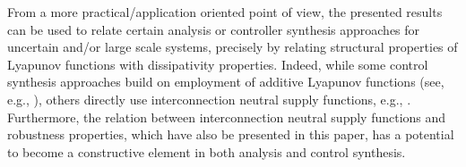 \documentclass[11pt,a4paper,oneside,DIV=12,headings=small]{scrartcl}
\theoremstyle{plain}
\begin{document}
From a more practical/application oriented point of view, the presented results can be used to relate certain analysis or controller synthesis approaches for uncertain and/or large scale systems, precisely by relating structural properties of Lyapunov functions with dissipativity properties. Indeed, while some control synthesis approaches build on employment of additive Lyapunov functions (see, e.g., \cite{Siljak, Zheng}), others  directly use interconnection neutral supply functions, e.g., \cite{Langbort}. Furthermore, the relation between interconnection neutral supply functions and robustness properties, which have also be presented in this paper, has a  potential to become a constructive element in both analysis and control synthesis. 

 
 

\end{document}
